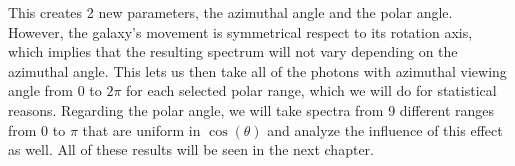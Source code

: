 This creates 2 new parameters, the azimuthal angle and the polar angle. However, the galaxy's movement is symmetrical respect to its rotation axis, which implies that the resulting spectrum will not vary depending on the azimuthal angle. This lets us then take all of the photons with azimuthal viewing angle from $0$ to $2\pi$ for each selected polar range, which we will do for statistical reasons. Regarding the polar angle, we will take spectra from 9 different ranges from $0$ to $\pi$ that are uniform in $\cos(\theta)$ and analyze the influence of this effect as well. All of these results will be seen in the next chapter. 